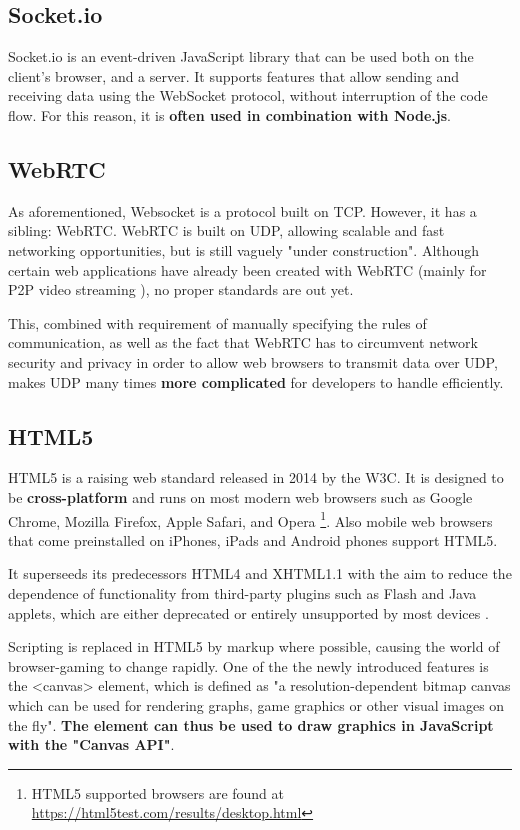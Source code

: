 \documentclass[bsc,frontabs,twoside,singlespacing,parskip,deptreport]{infthesis}     %
\begin{document}
\subsection{Socket.io}
Socket.io is an event-driven JavaScript library that can be used both on the client's browser, and a server\cite{Socketio}. It supports features that allow sending and receiving data using the WebSocket protocol, without interruption of the code flow\cite{Socketio_Benchmark}\cite{Socketio_TCP_Benchmark}. For this reason, it is \textbf{often used in combination with Node.js}.

\subsection{WebRTC}
As aforementioned, Websocket is a protocol built on TCP. However, it has a sibling: WebRTC. WebRTC is built on UDP, allowing scalable and fast networking opportunities, but is still vaguely "under construction"\cite{Browser_Networking}. Although certain web applications have already been created with WebRTC (mainly for P2P video streaming \cite{P2P_Video_Streaming_HTML5_WebRTC}), no proper standards are out yet\cite{Web_Apps_Superior}.

This, combined with requirement of manually specifying the rules of communication, as well as the fact that WebRTC has to circumvent network security and privacy in order to allow web browsers to transmit data over UDP\cite{P2P_Video_Streaming_HTML5_WebRTC}, makes UDP many times \textbf{more complicated} for developers to handle efficiently.

\subsection{HTML5}
HTML5 is a raising web standard released in 2014 by the W3C. It is designed to be \textbf{cross-platform} and runs on most modern web browsers such as Google Chrome, Mozilla Firefox, Apple Safari, and Opera \footnote{HTML5 supported browsers are found at \url{https://html5test.com/results/desktop.html}}. Also mobile web browsers that come preinstalled on iPhones, iPads and Android phones support HTML5.

It superseeds its predecessors HTML4 and XHTML1.1 with the aim to reduce the dependence of functionality from third-party plugins such as Flash and Java applets, which are either deprecated or entirely unsupported by most devices \cite{Death_Flash_Java}.

Scripting is replaced in HTML5 by markup where possible, causing the world of browser-gaming to change rapidly. One of the the newly introduced features is the <canvas> element, which is defined as "a resolution-dependent bitmap canvas which can be used for rendering graphs, game graphics or other visual images on the fly"\cite{HTML5_Up_and_Running}. \textbf{The element can thus be used to draw graphics in JavaScript with the "Canvas API"}\cite{Canvas_API}.
\end{document}
